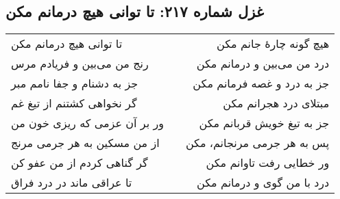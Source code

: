 \begin{center}
\section*{غزل شماره ۲۱۷: تا توانی هیچ درمانم مکن}
\label{sec:217}
\begin{longtable}{l p{0.5cm} r}
تا توانی هیچ درمانم مکن
&&
هیچ گونه چارهٔ جانم مکن
\\
رنج من می‌بین و فریادم مرس
&&
درد من می‌بین و درمانم مکن
\\
جز به دشنام و جفا نامم مبر
&&
جز به درد و غصه فرمانم مکن
\\
گر نخواهی کشتنم از تیغ غم
&&
مبتلای درد هجرانم مکن
\\
ور بر آن عزمی که ریزی خون من
&&
جز به تیغ خویش قربانم مکن
\\
از من مسکین به هر جرمی مرنج
&&
پس به هر جرمی مرنجانم، مکن
\\
گر گناهی کردم از من عفو کن
&&
ور خطایی رفت تاوانم مکن
\\
تا عراقی ماند در درد فراق
&&
درد با من گوی و درمانم مکن
\\
\end{longtable}
\end{center}
